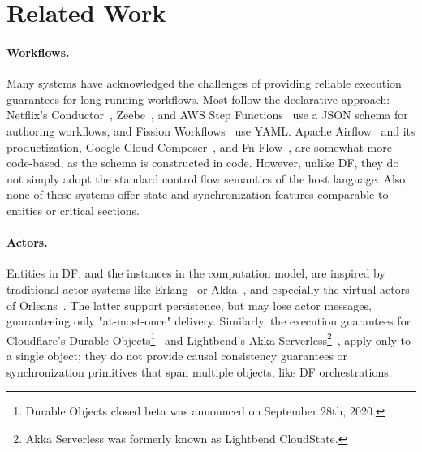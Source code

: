 \section{Related Work}


%
\paragraph{Workflows.} 
Many systems have acknowledged the challenges of providing reliable execution guarantees for long-running workflows. Most follow the declarative approach: Netflix's Conductor~\cite{conductor}, Zeebe~\cite{zeebe}, and AWS Step Functions~\cite{aws-step-functions} use a JSON schema for authoring workflows, and Fission Workflows~\cite{fission} use YAML.  Apache Airflow~\cite{airflow} and its productization, Google Cloud Composer~\cite{cloudcomposer}, and Fn Flow~\cite{flow}, are somewhat more code-based, as the schema is constructed in code. However, unlike DF, they do not simply adopt the standard control flow semantics of the host language. Also, none of these systems offer state and synchronization features comparable to entities or critical sections.

\paragraph{Actors.}  Entities in DF, and the instances in the computation model, are inspired by traditional actor systems like Erlang~\cite{armstrong1997development} or Akka~\cite{haller2012integration}, and especially the virtual actors of Orleans~\cite{bykov2011orleans}. The latter support persistence, but may lose actor messages, guaranteeing only "at-most-once" delivery. Similarly, the execution guarantees for Cloudflare's Durable Objects\footnote{Durable Objects closed beta was announced on September 28th, 2020.}~\cite{introduction-to-durable-objects, using-durable-objects} and Lightbend's Akka Serverless\footnote{Akka Serverless was formerly known as Lightbend CloudState.}~\cite{cloudstate}, apply only to a single object; they do not provide causal consistency guarantees or synchronization primitives that span multiple objects, like DF orchestrations.

